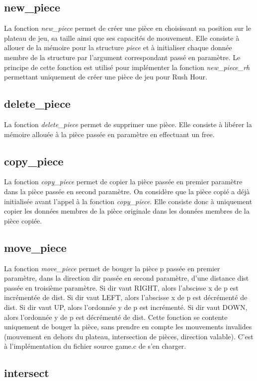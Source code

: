 \documentclass{report}
\begin{document}
\subsection{new\_piece}
La fonction \emph{new\_piece} permet de créer une pièce en choisissant sa position sur le plateau de jeu, sa taille ainsi que ses capacités de mouvement. Elle consiste à allouer de la mémoire pour la structure \emph{piece} et à initialiser chaque donnée membre de la structure par l'argument correspondant passé en paramètre. Le principe de cette fonction est utilisé pour implémenter la fonction \emph{new\_piece\_rh} permettant uniquement de créer une pièce de jeu pour Rush Hour.
\subsection{delete\_piece}
La fonction \emph{delete\_piece} permet de supprimer une pièce. Elle consiste à libérer la mémoire allouée à la pièce passée en paramètre en effectuant un free.
\subsection{copy\_piece}
La fonction \emph{copy\_piece} permet de copier la pièce passée en premier paramètre dans la pièce passée en second paramètre. On considère que la pièce copié a déjà initialisée avant l'appel à la fonction \emph{copy\_piece}. Elle consiste donc à uniquement copier les données membres de la pièce originale dans les données membres de la pièce copiée. 
\subsection{move\_piece}
La fonction \emph{move\_piece} permet de bouger la pièce p passée en premier paramètre, dans la direction dir passée en second paramètre, d'une distance dist passée en troisième paramètre. Si dir vaut RIGHT, alors l'abscisse x de p est incrémentée de dist. Si dir vaut LEFT, alors l'abscisse x de p est décrémenté de dist. Si dir vaut UP, alors l'ordonnée y de p est incrémenté. Si dir vaut DOWN, alors l'ordonnée y de p est décrémenté de dist. Cette fonction se contente uniquement de bouger la pièce, sans prendre en compte les mouvements invalides (mouvement en dehors du plateau, intersection de pièces, direction valable). C'est à l'implémentation du fichier source game.c de s'en charger.
\subsection{intersect}
\end{document}
